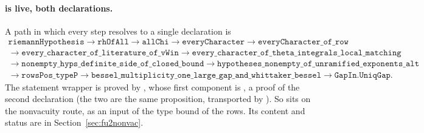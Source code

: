 \documentclass[11pt]{article}
\theoremstyle{remark}
\begin{document}
\paragraph{ is live, both declarations.} A path in which every step resolves to a single declaration is
\begin{multline*}
\texttt{riemannHypothesis}\to\texttt{rhOfAll}\to\texttt{allChi}\to\texttt{everyCharacter}\to\texttt{everyCharacter\_of\_row}\\
\to\texttt{every\_character\_of\_literature\_of\_vWin}\to\texttt{every\_character\_of\_theta\_integrals\_local\_matching}\\
\to\texttt{nonempty\_hyps\_definite\_side\_of\_closed\_bound}\to\texttt{hypotheses\_nonempty\_of\_unramified\_exponents\_alt}\\
\to\texttt{rowsPos\_typeP}\to\texttt{bessel\_multiplicity\_one\_large\_gap\_and\_whittaker\_bessel}\to\texttt{GapIn.UniqGap}.
\end{multline*}
The statement wrapper is proved by , whose first component is , a proof of the second declaration  (the two are the same proposition, transported by ). So  sits on the nonvacuity route, as an input of the type bound  of the rows. Its content and status are in Section~\ref{sec:fu2nonvac}.
\end{document}
